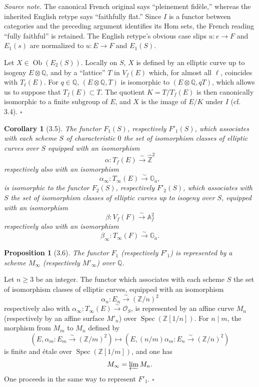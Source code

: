\documentclass[10pt]{article}
\newcommand{\Af}{\mathbb A_f}
\newcommand{\Q}{\mathbb Q}
\newcommand{\Z}{\mathbb Z}
\newcommand{\bZ}{\widehat{\mathbb Z}}
\newcommand{\Ga}{\mathbb G_a}
\newcommand{\Spec}{\operatorname{Spec}}
\newcommand{\cO}{\mathcal O}
\newcommand{\QED}{\hfill$\square$}
\newtheorem*{proposition}{Proposition}
\newtheorem*{corollary}{Corollary}
\begin{document}
\noindent\emph{Source note.} The canonical French original says ``pleinement fidèle,''
whereas the inherited English retype says ``faithfully flat.'' Since $I$ is a functor between
categories and the preceding argument identifies its Hom sets, the French reading ``fully
faithful'' is retained. The English retype's obvious case slips $u:e\to F$ and $E_1(s)$ are
normalized to $u:E\to F$ and $E_1(S)$.

Let $X\in\operatorname{Ob}(E_2(S))$. Locally on $S$, $X$ is defined by an elliptic curve
up to isogeny $E\otimes\Q$, and by a ``lattice'' $T$ in $V_f(E)$ which, for almost all $\ell$,
coincides with $T_\ell(E)$. For $q\in\Q$, $(E\otimes\Q,T)$ is isomorphic to
$(E\otimes\Q,qT)$, which allows us to suppose that $T_f(E)\subset T$. The quotient
$K=T/T_f(E)$ is then canonically isomorphic to a finite subgroup of $E$, and $X$ is the
image of $E/K$ under $I$ (cf. 3.4). \QED

\begin{corollary}[3.5]
The functor $F_1(S)$, respectively $F'_1(S)$, which associates with each scheme $S$ of
characteristic $0$ the set of isomorphism classes of elliptic curves over $S$ equipped with
an isomorphism
\[
\alpha:T_f(E)\xrightarrow{\sim}\bZ^2
\]
respectively also with an isomorphism
\[
\alpha_\infty:T_\infty(E)\xrightarrow{\sim}\Ga,
\]
is isomorphic to the functor $F_2(S)$, respectively $F'_2(S)$, which associates with $S$ the
set of isomorphism classes of elliptic curves up to isogeny over $S$, equipped with an
isomorphism
\[
\beta:V_f(F)\xrightarrow{\sim}\Af^2
\]
respectively also with an isomorphism
\[
\beta_\infty:T_\infty(F)\xrightarrow{\sim}\Ga.
\]
\end{corollary}

\begin{proposition}[3.6]
The functor $F_1$ (respectively $F'_1$) is represented by a scheme $M_\infty$ (respectively
$M'_\infty$) over $\Q$.
\end{proposition}

Let $n\ge 3$ be an integer. The functor which associates with each scheme $S$ the set of
isomorphism classes of elliptic curves, equipped with an isomorphism
\[
\alpha_n:E_n\xrightarrow{\sim}(\Z/n)^2
\]
respectively also with $\alpha_\infty:T_\infty(E)\xrightarrow{\sim}\cO_S$, is represented by
an affine curve $M_n$ (respectively by an affine surface $M'_n$) over $\Spec(\Z[1/n])$.
For $n\mid m$, the morphism from $M_m$ to $M_n$ defined by
\[
(E,\alpha_m:E_m\xrightarrow{\sim}(\Z/m)^2)
\longmapsto
(E,(n/m)\alpha_m:E_n\xrightarrow{\sim}(\Z/n)^2)
\]
is finite and étale over $\Spec(\Z[1/m])$, and one has
\[
M_\infty=\varprojlim M_n .
\]
One proceeds in the same way to represent $F'_1$. \QED
\end{document}
